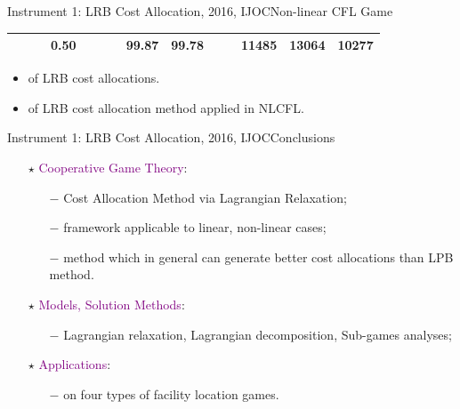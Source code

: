 \documentclass[14pt]{beamer}
\begin{document}
\begin{frame}{Instrument 1: LRB Cost Allocation, {\footnotesize 2016, IJOC}}{Non-linear CFL Game}
\begin{table}[H]
\begin{tabular}[!h]{c c c c c c c c c c c c c c}
&&&0.50    && &{\color{teal}{\bf 99.81}}	&99.87	&99.78	&&	&11485	&13064	&10277\\
\hline
\end{tabular}
\end{table}
\vspace{-1.2em}
\begin{shaded}
\begin{itemize}
\footnotesize
\item {\color{red}{Effectiveness}} of LRB cost allocations.
\item {\color{red}{Time efficiency}} of LRB cost allocation method applied in NLCFL.
\end{itemize}
\end{shaded}
\end{frame}


\begin{frame}{Instrument 1: LRB Cost Allocation, {\footnotesize 2016, IJOC}}{Conclusions}
\centering
\begin{itemize}
\normalsize
\justifying
\item[$\star$] \textcolor{purple}{Cooperative Game Theory}:
\begin{itemize}
\small
\vspace{2mm}
\item[$-$] {\color{blue}{New}} Cost Allocation Method via Lagrangian Relaxation;
\vspace{2mm}
\item[$-$] {\color{blue}{Generic}} framework applicable to linear, non-linear cases;
\vspace{2mm}
\item[$-$] {\color{blue}{Effective}} method which in general can generate better cost allocations than LPB method.
\vspace{2mm}
\end{itemize}
\item[$\star$] \textcolor{purple}{Models, Solution Methods}:
\begin{itemize}
\small
\vspace{2mm}
\item[$-$] Lagrangian relaxation, Lagrangian decomposition, Sub-games analyses;
\vspace{2mm}
\end{itemize}
\item[$\star$] \textcolor{purple}{Applications}:
\begin{itemize}
\small
\vspace{2mm}
	\item[$-$] {\color{blue}{Implementations}} on four types of facility location games.
\end{itemize}
\end{itemize}
\end{frame}
\end{document}
